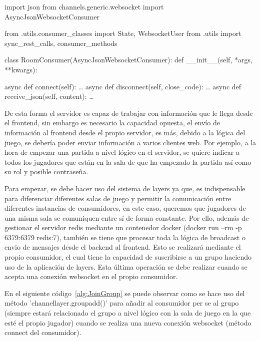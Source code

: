 \begin{mypython}[float={h},caption={RoomConsumer},label={alg:RoomConsumer}]
	import json
	from channels.generic.websocket import AsyncJsonWebsocketConsumer
																																																	
	from .utils.consumer_classes import State, WebsocketUser
	from .utils import sync_rest_calls, consumer_methods
	
	class RoomConsumer(AsyncJsonWebsocketConsumer):
	def __init__(self, *args, **kwargs):
																																																	
	async def connect(self): \dots																																			
	async def disconnect(self, close_code):	\dots																																			
	async def receive_json(self, content): \dots	
\end{mypython}

De esta forma el servidor es capaz de trabajar con información que le llega desde el frontend, sin embargo es necesario la capacidad opuesta, el envío de información al 
frontend desde el propio servidor, es más, debido a la lógica del juego, se debería poder enviar información a varios clientes web. Por ejemplo, a la hora de empezar una partida
a nivel lógico en el servidor, se quiere indicar a todos los jugadores que están en la sala de que ha empezado la partida así como su rol y posible contraseña.

Para empezar, se debe hacer uso del sistema de layers ya que, es indispensable para diferenciar diferentes salas de juego y permitir 
la comunicación entre diferentes instancias de consumidores, en este caso, queremos que jugadores de una misma sala se comuniquen entre sí de forma constante. 
Por ello, además de gestionar el servidor redis mediante un contenedor docker (docker run --rm -p 6379:6379 redis:7), también se tiene que procesar toda la lógica de broadcast
o envio de mensajes desde el backend al frontend. Esto se realizará mediante el propio consumidor, el cual tiene la capacidad de suscribirse a un grupo haciendo uso
de la aplicación de layers. Esta última operación se debe realizar cuando se acepta una conexión websocket en el propio consumidor. 

En el siguiente código~\ref{alg:JoinGroup} se puede observar como se hace uso del método 'channel\textunderscore layer.group\textunderscore add()' para añadir al consumidor per se 
al grupo (siempre estará relacionado el grupo a nivel lógico con la sala de juego en la que esté el propio jugador) cuando se realiza una nueva conexión websocket (método connect del consumidor). 

